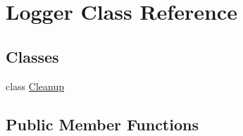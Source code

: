 \hypertarget{classLogger}{}\section{Logger Class Reference}
\label{classLogger}
\subsection*{Classes}
\begin{DoxyCompactItemize}
\item 
class \hyperlink{classLogger_1_1Cleanup}{Cleanup}
\end{DoxyCompactItemize}
\subsection*{Public Member Functions}
